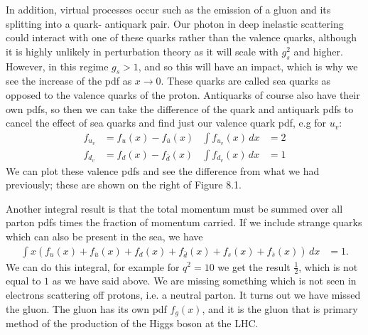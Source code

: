\documentclass[relqm.tex]{subfiles}
\begin{document}
In addition, virtual processes occur such as the emission of a gluon and its splitting into a quark- antiquark pair. 
Our photon in deep inelastic scattering could interact with one of these quarks rather than the valence quarks, although it is highly unlikely in perturbation theory as it will scale with $g_s^2$ and higher. 
However, in this regime $g_s>1$, and so this will have an impact, which is why we see the increase of the pdf as $x\to0$.
These quarks are called sea quarks as opposed to the valence quarks of the proton. 
Antiquarks of course also have their own pdfs, so then we can take the difference of the quark and antiquark pdfs to cancel the effect of sea quarks and find just our valence quark pdf, e.g for $u_v$:
\begin{align}
    f_{u_v} &= f_u(x) - f_{\bar{u}}(x) & \int f_{u_v}(x)\,dx &= 2\\
    f_{d_v} &= f_d(x) - f_{\bar{d}}(x) & \int f_{d_v}(x)\,dx &= 1
\end{align}
We can plot these valence pdfs and see the difference from what we had previously; these are shown on the right of Figure 8.1.

Another integral result is that the total momentum must be summed over all parton pdfs times the fraction of momentum carried.
If we include strange quarks which can also be present in the sea, we have
\begin{align}
    \int x\left(f_u(x)+f_{\bar{u}}(x)+f_d(x)+f_{\bar{d}}(x)+f_s(x)+f_{\bar{s}}(x)\right)\,dx &= 1.
\end{align}
We can do this integral, for example for $q^2=10$ we get the result $\frac12$, which is not equal to $1$ as we have said above. 
We are missing something which is not seen in electrons scattering off protons, i.e. a neutral parton. 
It turns out we have missed the gluon. 
The gluon has its own pdf $f_g(x)$, and it is the gluon that is primary method of the production of the Higgs boson at the LHC.
\end{document}
